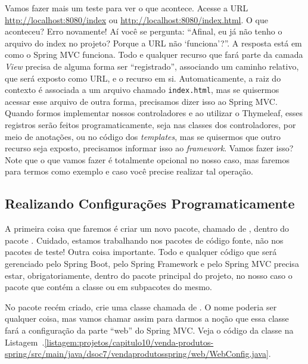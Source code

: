 Vamos fazer mais um teste para ver o que acontece. Acesse a URL \url{http://localhost:8080/index} ou \url{http://localhost:8080/index.html}. O que aconteceu? Erro novamente! Aí você se pergunta: ``Afinal, eu já não tenho o arquivo do index no projeto? Porque a URL não `funciona'?''. A resposta está em como o Spring MVC funciona. Todo e qualquer recurso que fará parte da camada \textit{View} precisa de alguma forma ser ``registrado'', associando um caminho relativo, que será exposto como URL, e o recurso em si. Automaticamente, a raiz do contexto é associada a um arquivo chamado \texttt{index.html}, mas se quisermos acessar esse arquivo de outra forma, precisamos dizer isso ao Spring MVC. Quando formos implementar nossos controladores e ao utilizar o Thymeleaf, esses registros serão feitos programaticamente, seja nas classes dos controladores, por meio de anotações, ou no código dos \textit{templates}, mas se quisermos que outro recurso seja exposto, precisamos informar isso ao \textit{framework}. Vamos fazer isso? Note que o que vamos fazer é totalmente opcional no nosso caso, mas faremos para termos como exemplo e caso você precise realizar tal operação.


\subsection{Realizando Configurações Programaticamente}

A primeira coisa que faremos é criar um novo pacote, chamado de , dentro do pacote . Cuidado, estamos trabalhando nos pacotes de código fonte, não nos pacotes de teste! Outra coisa importante. Todo e qualquer código que será gerenciado pelo Spring Boot, pelo Spring Framework e pelo Spring MVC precisa estar, obrigatoriamente, dentro do pacote principal do projeto, no nosso caso o pacote  que contém a classe  ou em subpacotes do mesmo.

No pacote  recém criado, crie uma classe chamada de . O nome poderia ser qualquer coisa, mas vamos chamar assim para darmos a noção que essa classe fará a configuração da parte ``web'' do Spring MVC. Veja o código da classe na Listagem~\thechapter.\ref{listagem:projetos/capitulo10/venda-produtos-spring/src/main/java/dsoc7/vendaprodutosspring/web/WebConfig.java}.


